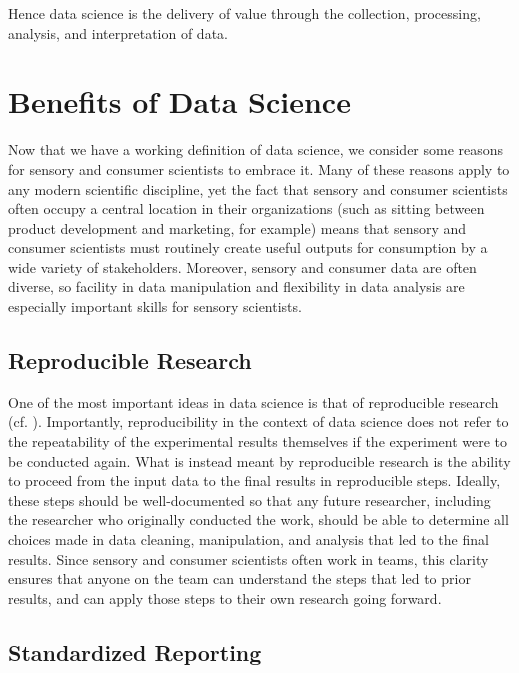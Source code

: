 \documentclass[
]{krantz}
\begin{document}
Hence data science is the delivery of value through the collection, processing, analysis, and interpretation of data.

\hypertarget{benefits-of-data-science}{%
\section{Benefits of Data Science}\label{benefits-of-data-science}}

Now that we have a working definition of data science, we consider some reasons for sensory and consumer scientists to embrace it. Many of these reasons apply to any modern scientific discipline, yet the fact that sensory and consumer scientists often occupy a central location in their organizations (such as sitting between product development and marketing, for example) means that sensory and consumer scientists must routinely create useful outputs for consumption by a wide variety of stakeholders. Moreover, sensory and consumer data are often diverse, so facility in data manipulation and flexibility in data analysis are especially important skills for sensory scientists.

\hypertarget{reproducible-research}{%
\subsection{Reproducible Research}\label{reproducible-research}}

One of the most important ideas in data science is that of reproducible research (cf. \citet{Peng2011}). Importantly, reproducibility in the context of data science does not refer to the repeatability of the experimental results themselves if the experiment were to be conducted again. What is instead meant by reproducible research is the ability to proceed from the input data to the final results in reproducible steps. Ideally, these steps should be well-documented so that any future researcher, including the researcher who originally conducted the work, should be able to determine all choices made in data cleaning, manipulation, and analysis that led to the final results. Since sensory and consumer scientists often work in teams, this clarity ensures that anyone on the team can understand the steps that led to prior results, and can apply those steps to their own research going forward.

\hypertarget{standardized-reporting}{%
\subsection{Standardized Reporting}\label{standardized-reporting}}
\end{document}
